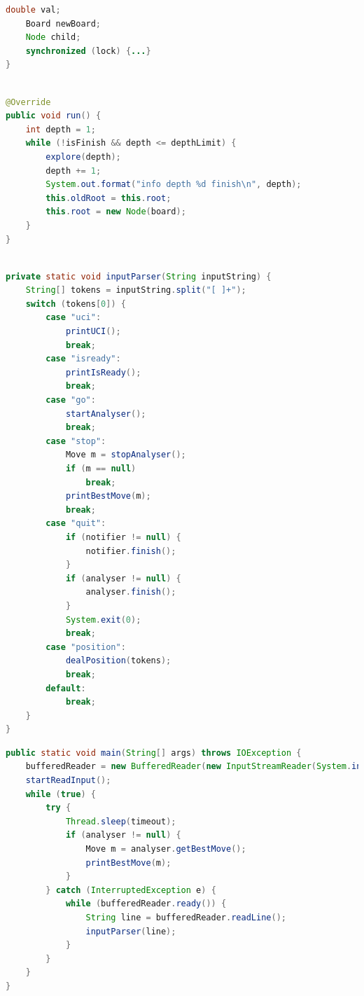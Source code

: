 \documentclass{article}
\begin{document}
\begin{appendices}
\begin{minipage}{\linewidth}
\begin{lstlisting}[language=java, caption={La variable \texttt{isFinish} et son utilisation sur la synchronisation.}, label={lst:isFinish}]
    double val;
    Board newBoard;
    Node child;
    synchronized (lock) {...}
}
\end{lstlisting}
\end{minipage}


\begin{lstlisting}[language=java, caption={La recherche récursive, réalisée par un thread séparant.}, label={lst:recherche}]

@Override
public void run() {
    int depth = 1;
    while (!isFinish && depth <= depthLimit) {
        explore(depth);
        depth += 1;
        System.out.format("info depth %d finish\n", depth);
        this.oldRoot = this.root;
        this.root = new Node(board);
    }
}
    
\end{lstlisting}

\begin{lstlisting}[language=java, caption={Le parseur qui traite les entrées.}, label={lst:parseur}]
private static void inputParser(String inputString) {
    String[] tokens = inputString.split("[ ]+");
    switch (tokens[0]) {
        case "uci":
            printUCI();
            break;
        case "isready":
            printIsReady();
            break;
        case "go":
            startAnalyser();
            break;
        case "stop":
            Move m = stopAnalyser();
            if (m == null)
                break;
            printBestMove(m);
            break;
        case "quit":
            if (notifier != null) {
                notifier.finish();
            }
            if (analyser != null) {
                analyser.finish();
            }
            System.exit(0);
            break;
        case "position":
            dealPosition(tokens);
            break;
        default:
            break;
    }
}
\end{lstlisting}

\begin{lstlisting}[language=java, caption={Le corps de la partie qui traiter les entrées/sorties.},label={lst:io}]
public static void main(String[] args) throws IOException {
    bufferedReader = new BufferedReader(new InputStreamReader(System.in));
    startReadInput();
    while (true) {
        try {
            Thread.sleep(timeout);
            if (analyser != null) {
                Move m = analyser.getBestMove();
                printBestMove(m);
            }
        } catch (InterruptedException e) {
            while (bufferedReader.ready()) {
                String line = bufferedReader.readLine();
                inputParser(line);
            }
        }
    }
}
    

\end{lstlisting}
\end{appendices}
\end{document}
